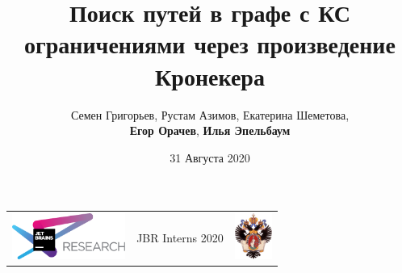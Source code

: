 \documentclass[xcolor=table,english,russian]{beamer}
\title[Kronecker Product CFPQ]{Поиск путей в графе с КС ограничениями через произведение Кронекера}
\institute[СПбГУ]{
JetBrains Research, Лаборатория языковых инструментов  \\
Санкт-Петербургский Государственный университет
}
\author[Егор Орачев, Илья Эпельбаум]{Семен Григорьев, Рустам Азимов, Екатерина Шеметова, \\ \textbf{Егор Орачев}, \textbf{Илья Эпельбаум}}
\date{31 Августа 2020}
\begin{document}
{
\begin{frame}[fragile]
  \begin{table}
  \centering
  \begin{tabularx}{\linewidth}{YcX}
    \includegraphics[height=1.5cm]{pictures/jetbrainsResearch.pdf} \hfill
    & \begin{minipage}[t]{0.3\textwidth}\center \vspace{-1cm}  JBR Interns 2020
      \end{minipage}
    & \hfill \includegraphics[height=1.5cm]{pictures/SPbGU_Logo.png}
  \end{tabularx}
  \end{table}
  \titlepage
\end{frame}
}
\end{document}
